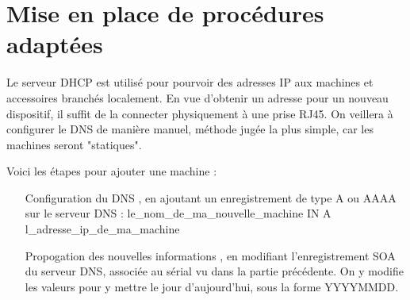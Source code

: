 \section{Mise en place de procédures adaptées}

Le serveur DHCP est utilisé pour pourvoir des adresses IP aux machines et 
accessoires branchés localement. En vue d'obtenir un adresse pour un 
nouveau dispositif, il suffit de la connecter physiquement à une prise RJ45.
On veillera à configurer le DNS de manière manuel, méthode jugée la plus simple,
car les machines seront "statiques".

Voici les étapes pour ajouter une machine :
\begin{itemize}
\item[Configuration du DNS], en ajoutant un enregistrement de type A ou AAAA
sur le serveur DNS :
le\_nom\_de\_ma\_nouvelle\_machine IN A l\_adresse\_ip\_de\_ma\_machine
\item[Propogation des nouvelles informations], en modifiant l'enregistrement SOA
du serveur DNS, associée au sérial vu dans la partie précédente. On y modifie les
valeurs pour y mettre le jour d'aujourd'hui, sous la forme YYYYMMDD.
\end{itemize}
